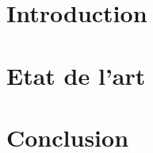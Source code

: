 \section{Introduction}
\vspace{0.2in}
\hspace*{0.16in}

\section{Etat de l'art}
\vspace{0.2in}
\hspace*{0.16in}

\section{Conclusion}
\vspace{0.1in}
\hspace*{0.16in}
